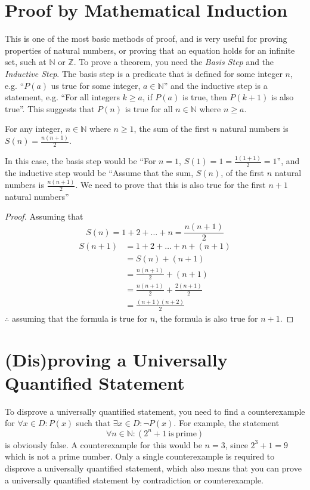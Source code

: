 \section*{Proof by Mathematical Induction}

This is one of the most basic methods of proof, and is very useful for proving properties of natural numbers, or
 proving that an equation holds for an infinite set, such at $\mathbb{N}$ or $\mathbb{Z}$. To prove a theorem, you need
 the \textit{Basis Step} and the \textit{Inductive Step}. The basis step is a predicate that is defined for some integer
 $n$, e.g. ``$P(a)$ us true for some integer, $a \in \mathbb{N}$'' and the inductive step is a statement, e.g. ``For all
 integers $k \geq a$, if $P(a)$ is true, then $P(k + 1)$ is also true''. This suggests that $P(n)$ is true for all
 $n \in \mathbb{N}$ where $n \geq a$.
\begin{theorem}
For any integer, $n \in \mathbb{N}$ where $n \geq 1$, the sum of the first $n$ natural numbers is
 $S(n) = \frac{n(n+1)}{2}$.
\end{theorem}
In this case, the basis step would be ``For $n = 1$, $S(1) = 1 = \frac{1(1+1)}{2} = 1$'', and the inductive step would
 be ``Assume that the sum, $S(n)$, of the first $n$ natural numbers is $\frac{n(n+1)}{2}$. We need to prove that this is
 also true for the first $n+1$ natural numbers''

\begin{proof}
Assuming that
\begin{equation*}
S(n) = 1 + 2 + \dots + n = \frac{n(n+1)}{2}
\end{equation*}
\begin{align*}
S(n+1) & = 1 + 2 + \dots + n + (n+1) \\
& = S(n) + (n+1) \\
& = \frac{n(n+1)}{2} + (n+1) \\
& = \frac{n(n+1)}{2} + \frac{2(n+1)}{2} \\
& = \frac{(n+1)(n+2)}{2}
\end{align*}
$\therefore$ assuming that the formula is true for $n$, the formula is also true for $n+1$.
\end{proof}

\section*{(Dis)proving a Universally Quantified Statement}

To disprove a universally quantified statement, you need to find a counterexample for $\forall x \in D: P(x)$ such that
 $\exists x \in D: \neg P(x)$. For example, the statement
\begin{equation*}
\forall n \in \mathbb{N}: (2^n + 1 \mathrm{\ is\ prime})
\end{equation*}
is obviously false. A counterexample for this would be $n = 3$, since $2^3 + 1 = 9$ which is not a prime number. Only a
 single counterexample is required to disprove a universally quantified statement, which also means that you can prove
 a universally quantified statement by contradiction or counterexample.